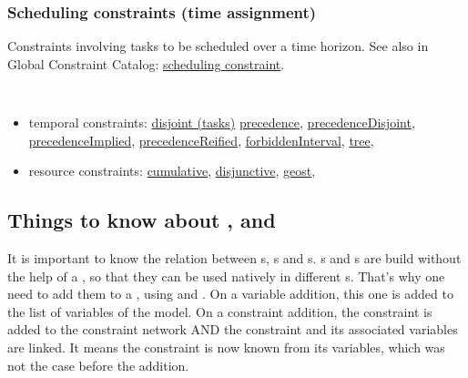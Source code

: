 \subsubsection{Scheduling constraints (time assignment)}\label{model:schedulingconstraints}\hypertarget{model:schedulingconstraints}{}
Constraints involving tasks to be scheduled over a time horizon.
See also in Global Constraint Catalog: \href{http://www.emn.fr/x-info/sdemasse/gccat/Kscheduling_constraint.html}{scheduling constraint}.

\vspace{1em}\noindent\begin{notedef}\tt
   \begin{itemize}
   \item temporal constraints:
\hyperlink{disjoint}{disjoint (tasks)} 
\hyperlink{precedence:precedenceconstraint}{precedence}, 
\hyperlink{precedencedisjoint:precedencedisjointconstraint}{precedenceDisjoint}, 
\hyperlink{precedenceimplied:precedenceimpliedconstraint}{precedenceImplied}, 
\hyperlink{precedencereified:precedencereifiedconstraint}{precedenceReified},
\hyperlink{forbiddeninterval:forbiddenintervalconstraint}{forbiddenInterval},
\hyperlink{tree:treeconstraint}{tree},
   \item resource constraints: 
\hyperlink{cumulative:cumulativeconstraint}{cumulative}, 
\hyperlink{disjunctive:disjunctiveconstraint}{disjunctive}, 
\hyperlink{geost:geostconstraint}{geost}, 
 \end{itemize}
\end{notedef}

\subsection{Things to know about ,  and }

It is important to know the relation between s, s and s. s and s are build without the help of a , so that they can be used natively in different s. That's why one need to add them to a , using  and . On a variable addition, this one is added to the list of variables of the model. On a constraint addition, the constraint is added to the constraint network AND the constraint and its associated variables are linked. It means the constraint is now known from its variables, which was not the case before the addition.


